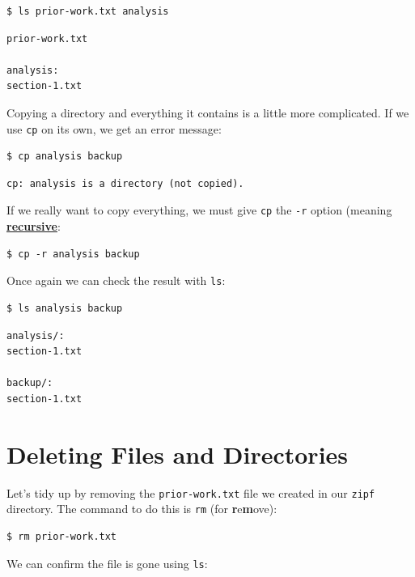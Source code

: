 \documentclass[
]{krantz}
\newcommand{\gref}[2]{\hyperlink{#2}{\textbf{#1}}}
\begin{document}
\begin{verbatim}
$ ls prior-work.txt analysis
\end{verbatim}

\begin{verbatim}
prior-work.txt

analysis:
section-1.txt
\end{verbatim}

Copying a directory and everything it contains is a little more complicated.
If we use \texttt{cp} on its own,
we get an error message:

\begin{verbatim}
$ cp analysis backup
\end{verbatim}

\begin{verbatim}
cp: analysis is a directory (not copied).
\end{verbatim}

If we really want to copy everything,
we must give \texttt{cp} the \texttt{-r} option (meaning \gref{recursive}{recursion}:

\begin{verbatim}
$ cp -r analysis backup
\end{verbatim}

Once again we can check the result with \texttt{ls}:

\begin{verbatim}
$ ls analysis backup
\end{verbatim}

\begin{verbatim}
analysis/:
section-1.txt

backup/:
section-1.txt
\end{verbatim}

\hypertarget{bash-basics-rm}{%
\section{Deleting Files and Directories}\label{bash-basics-rm}}

Let's tidy up by removing the \texttt{prior-work.txt} file we created in our \texttt{zipf} directory.
The command to do this is \texttt{rm} (for \textbf{r}e\textbf{m}ove):

\begin{verbatim}
$ rm prior-work.txt
\end{verbatim}

We can confirm the file is gone using \texttt{ls}:
\end{document}
